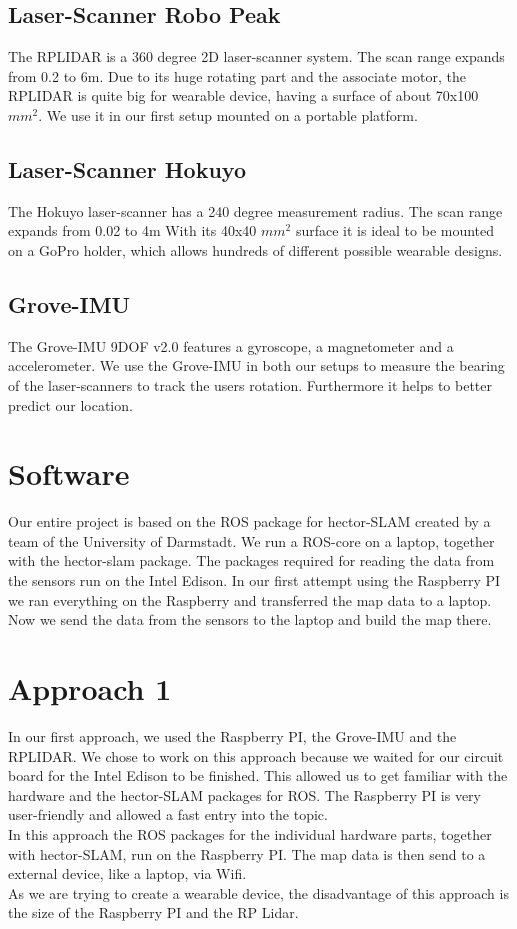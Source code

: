\documentclass{sigchi-ext}
\begin{document}
\subsection{Laser-Scanner Robo Peak}
The RPLIDAR is a 360 degree 2D laser-scanner system. The scan range expands from 0.2 to 6m. Due to its huge rotating part and the associate motor, the RPLIDAR is quite big for wearable device, having a surface of about 70x100 $mm^2$. We use it in our first setup mounted on a portable platform.
\subsection{Laser-Scanner Hokuyo}
The Hokuyo laser-scanner has a 240 degree measurement radius. The scan range expands from 0.02 to 4m With its 40x40 $mm^2$ surface it is ideal to be mounted on a GoPro holder, which allows hundreds of different possible wearable designs.
\subsection{Grove-IMU}
The Grove-IMU 9DOF v2.0 features a gyroscope, a magnetometer and a accelerometer. We use the Grove-IMU in both our setups to measure the bearing of the laser-scanners to track the users rotation. Furthermore it helps to better predict our location.
\section{Software}
Our entire project is based on the ROS package for hector-SLAM created by a team of the University of Darmstadt. We run a ROS-core on a laptop, together with the hector-slam package. The packages required for reading the data from the sensors run on the Intel Edison. In our first attempt using the Raspberry PI we ran everything on the Raspberry and transferred the map data to a laptop. Now we send the data from the sensors to the laptop and build the map there. 
\section{Approach 1}
In our first approach, we used the Raspberry PI, the Grove-IMU and the RPLIDAR. We chose to work on this approach because we waited for our circuit board for the Intel Edison to be finished. This allowed us to get familiar with the hardware and the hector-SLAM packages for ROS. The Raspberry PI is very user-friendly and allowed a fast entry into the topic.\\
In this approach the ROS packages for the individual hardware parts, together with hector-SLAM, run on the Raspberry PI. The map data is then send to a external device, like a laptop, via Wifi.\\ 
As we are trying to create a wearable device, the disadvantage of this approach is the size of the Raspberry PI and the RP Lidar.
\end{document}
